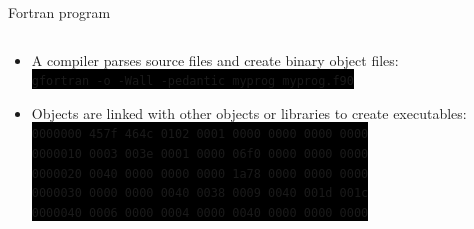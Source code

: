 \documentclass[unknownkeysallowed, 10pt, a4 paper, handout]{beamer}
\newcommand{\code}[1]{\colorbox{black}{\color{green}\texttt{#1}}}
\begin{document}
\begin{frame}[label=Fortran]{Fortran program}
\begin{columns}[T]
\begin{column}{.76\textwidth}
\begin{itemize}
{          }
        \item \normalsize{A compiler parses source files and create
           binary object files:} \\
          \footnotesize{
          \code{gfortran -o -Wall -pedantic myprog myprog.f90}
          }
        \item \normalsize{Objects are linked with other objects or
           libraries to create executables:} \\
          \footnotesize{
          \code{0000000 457f 464c 0102 0001 0000 0000 0000 0000} \\
          \code{0000010 0003 003e 0001 0000 06f0 0000 0000 0000} \\
          \code{0000020 0040 0000 0000 0000 1a78 0000 0000 0000} \\
          \code{0000030 0000 0000 0040 0038 0009 0040 001d 001c} \\
          \code{0000040 0006 0000 0004 0000 0040 0000 0000 0000}
          }
      \end{itemize}
    \end{column}
  \end{columns}
\end{frame}
\end{document}
